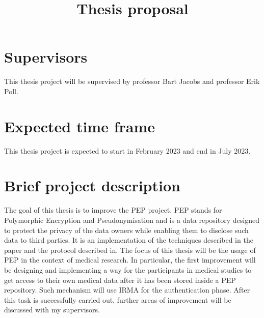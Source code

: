 \documentclass[a4paper]{article}
\begin{document}
\title{Thesis proposal}
\date{}
\maketitle
\section{Supervisors}
This thesis project will be supervised by professor Bart Jacobs and professor Erik Poll.

\section{Expected time frame}
This thesis project is expected to start in February 2023 and end in July 2023.

\section{Brief project description}
The goal of this thesis is to improve the PEP project\cite{pepproject}. PEP stands for Polymorphic Encryption and Pseudonymisation and is a data repository designed to protect the privacy of the data owners while enabling them to disclose such data to third parties. It is an implementation of the techniques described in the paper\cite{peppaper} and the protocol described in\cite{cryptoeprint}. The focus of this thesis will be the usage of PEP in the context of medical research. In particular, the first improvement will be designing and implementing a way for the participants in medical studies to get access to their own medical data after it has been stored inside a PEP repository. Such mechanism will use IRMA\cite{irma-app}\cite{about-irma} for the authentication phase. After this task is successfully carried out, further areas of improvement will be discussed with my supervisors.  

\printbibliography
\end{document}
